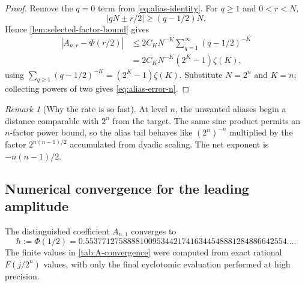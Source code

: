\documentclass[11pt,oneside]{article}
\theoremstyle{definition}
\theoremstyle{remark}
\newtheorem{remark}[theorem]{Remark}
\newcommand{\PhiU}{\Phi}
\begin{document}
\begin{proof}
Remove the $q=0$ term from \eqref{eq:alias-identity}.  For $q\ge1$ and
$0<r<N$,
\[
 |qN\pm r/2|\ge(q-1/2)N.
\]
Hence \cref{lem:selected-factor-bound} gives
\begin{align*}
 |A_{n,r}-\PhiU(r/2)|
 &\le 2C_KN^{-K}\sum_{q=1}^{\infty}(q-1/2)^{-K}\\
 &=2C_KN^{-K}(2^K-1)\zeta(K),
\end{align*}
using
$\sum_{q\ge1}(q-1/2)^{-K}=(2^K-1)\zeta(K)$.
Substitute $N=2^n$ and $K=n$; collecting powers of two gives
\eqref{eq:alias-error-n}.
\end{proof}

\begin{remark}[Why the rate is so fast]
At level $n$, the unwanted aliases begin a distance comparable with $2^n$
from the target.  The same sinc product permits an $n$-factor power bound, so
the alias tail behaves like $(2^n)^{-n}$ multiplied by the factor
$2^{n(n-1)/2}$ accumulated from dyadic scaling.  The net exponent is
$-n(n-1)/2$.
\end{remark}

\subsection{Numerical convergence for the leading amplitude}

The distinguished coefficient $A_{n,1}$ converges to
\begin{equation}\label{eq:h-value}
 h:=\PhiU(1/2)
 =0.553771275888810095344217416344548881284886642554\ldots.
\end{equation}
The finite values in \cref{tab:A-convergence} were computed from exact rational
$F(j/2^n)$ values, with only the final cyclotomic evaluation performed at high
precision.
\end{document}
